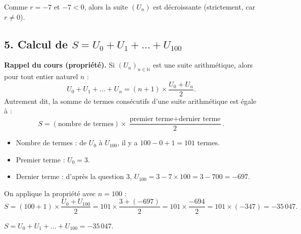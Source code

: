 \documentclass[12pt,a4paper]{article}
\begin{document}
\begin{resultat}
Comme $r = -7$ et $-7 < 0$, alors la suite $(U_n)$ est décroissante (strictement, car $r \neq 0$).
\end{resultat}

\subsection*{5. Calcul de $S = U_0 + U_1 + \dots + U_{100}$}
\textbf{Rappel du cours (propriété).} Si $(U_n)_{n\in\mathbb{N}}$ est une suite arithmétique, alors pour
tout entier naturel $n$ :
\[
U_0 + U_1 + \dots + U_n = (n + 1) \times \frac{U_0 + U_n}{2}.
\]
Autrement dit, la somme de termes consécutifs d'une suite arithmétique est égale à :
\[
S = (\text{nombre de termes}) \times \frac{\text{premier terme} + \text{dernier terme}}{2}.
\]

\begin{itemize}[nosep]
  \item Nombre de termes : de $U_0$ à $U_{100}$, il y a $100 - 0 + 1 = 101$ termes.
  \item Premier terme : $U_0 = 3$.
  \item Dernier terme : d'après la question 3, $U_{100} = 3 - 7 \times 100 = 3 - 700 = -697$.
\end{itemize}

On applique la propriété avec $n = 100$ :
\[
S = (100 + 1) \times \frac{U_0 + U_{100}}{2}
  = 101 \times \frac{3 + (-697)}{2}
  = 101 \times \frac{-694}{2}
  = 101 \times (-347)
  = -35\,047.
\]

\begin{resultat}
$S = U_0 + U_1 + \dots + U_{100} = -35\,047$.
\end{resultat}
\end{document}
